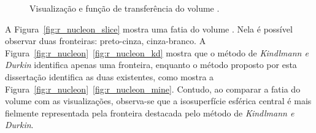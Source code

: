 \begin{figure}[h]
	\centering
	\caption{Visualização e função de transferência do volume .}
	\label{fig:r_3sphere}
\end{figure}

	A Figura~\ref{fig:r_nucleon_slice} mostra uma fatia do volume . Nela é possível observar duas fronteiras: preto-cinza, cinza-branco. A Figura~\ref{fig:r_nucleon}~\ref{fig:r_nucleon_kd} mostra que o método de \textit{Kindlmann e Durkin} identifica apenas uma fronteira, enquanto o método proposto por esta dissertação identifica as duas existentes, como mostra a Figura~\ref{fig:r_nucleon}~\ref{fig:r_nucleon_mine}. Contudo, ao comparar a fatia do volume com as visualizações, observa-se que a isosuperfície esférica central é mais fielmente representada pela fronteira destacada pelo método de \textit{Kindlmann e Durkin}.
	
